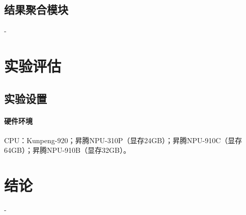 \documentclass{ctexart}
\newcommand{\simkai}{\CJKfamily{KaiTi}}
\begin{document}
\subsection{结果聚合模块}
-
\section{实验评估}

\subsection{实验设置}

\paragraph{硬件环境} 
CPU：Kunpeng-920；昇腾NPU-310P（显存24GB）；昇腾NPU-910C（显存64GB）；昇腾NPU-910B（显存32GB）。

\section{结论}
-

\printbibliography[
  heading=bibliography,
  title={\zihao{5}\simkai\textbf{参考文献}}
]
\end{document}
